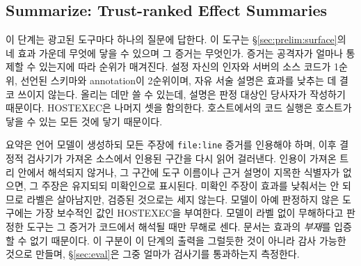 \documentclass[acmsmall,screen,review,anonymous]{acmart}
\begin{document}
\subsection{Summarize: Trust-ranked Effect Summaries}

이 단계는 광고된 도구마다 하나의 질문에 답한다. 이 도구는 \S\ref{sec:prelim:surface}의 네 효과 가운데 무엇에 닿을 수 있으며 그 증거는 무엇인가. 증거는 공격자가 얼마나 통제할 수 있는지에 따라 순위가 매겨진다. 설정 자신의 인자와 서버의 소스 코드가 1순위, 선언된 스키마와 annotation이 2순위이며, 자유 서술 설명은 효과를 낮추는 데 결코 쓰이지 않는다. 올리는 데만 쓸 수 있는데, 설명은 판정 대상인 당사자가 작성하기 때문이다. HOSTEXEC은 나머지 셋을 함의한다. 호스트에서의 코드 실행은 호스트가 닿을 수 있는 모든 것에 닿기 때문이다.

요약은 언어 모델이 생성하되 모든 주장에 \texttt{file:line} 증거를 인용해야 하며, 이후 결정적 검사기가 가져온 소스에서 인용된 구간을 다시 읽어 걸러낸다. 인용이 가져온 트리 안에서 해석되지 않거나, 그 구간에 도구 이름이나 근거 설명이 지목한 식별자가 없으면, 그 주장은 유지되되 미확인으로 표시된다. 미확인 주장이 효과를 낮춰서는 안 되므로 라벨은 살아남지만, 검증된 것으로는 세지 않는다. 모델이 아예 판정하지 않은 도구에는 가장 보수적인 값인 HOSTEXEC을 부여한다. 모델이 라벨 없이 무해하다고 판정한 도구는 그 증거가 코드에서 해석될 때만 무해로 센다. 문서는 효과의 \emph{부재}를 입증할 수 없기 때문이다. 이 구분이 이 단계의 출력을 그럴듯한 것이 아니라 감사 가능한 것으로 만들며, \S\ref{sec:eval}은 그중 얼마가 검사기를 통과하는지 측정한다.
\end{document}
